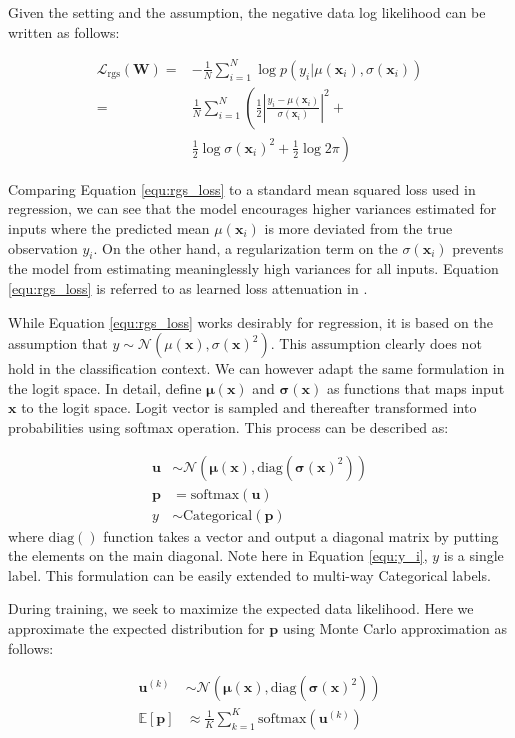 \documentclass[letterpaper]{article} %
\newcommand{\vect}[1]{\mathbf{#1}}
\newcommand{\matr}[1]{\mathbf{#1}}
\newcommand{\vp}[0]{\vect{p}}
\newcommand{\vu}[0]{\vect{u}}
\newcommand{\vx}[0]{\vect{x}}
\newcommand{\vmu}{\boldsymbol{\mu}}
\newcommand{\vsigma}{\boldsymbol{\sigma}}
\newcommand{\vlb}{\mathcal{L}}
\newcommand{\E}{\mathbb{E}}
\newcommand{\N}{\mathcal{N}}
\newcommand{\mW}[0]{\matr{W}}
\newcommand\diag{\text{diag}}
\newcommand\softmax{\text{softmax}}
\begin{document}
Given the setting and the assumption, the negative data log likelihood can be written as follows:

\begin{align}
\label{equ:rgs_loss}
\vlb_{\text{rgs}}(\mW)= & -\frac{1}{N}\sum_{i=1}^N\log{p(y_i|\mu(\vx_i),\sigma(\vx_i))} \nonumber \\
= & \frac{1}{N} \sum_{i=1}^N \left(\frac{1}{2}\left|\frac{y_i-\mu(\vx_i)}{\sigma(\vx_i)}\right|^2 + \right.\nonumber \\
& \left.\frac{1}{2}\log{\sigma(\vx_i)^2} + \frac{1}{2}\log{2\pi}\right)
\end{align}

Comparing Equation \ref{equ:rgs_loss} to a standard mean squared loss used in regression, we can see that the model encourages higher variances estimated for inputs where the predicted mean $\mu(\vx_i)$ is more deviated from the true observation $y_i$. On the other hand, a regularization term on the $\sigma(\vx_i)$ prevents the model from estimating meaninglessly high variances for all inputs. Equation \ref{equ:rgs_loss} is referred to as learned loss attenuation in \cite{kendall2017uncertainties}.

While Equation \ref{equ:rgs_loss} works desirably for regression, it is based on the assumption that $y\sim\N(\mu(\vx), \sigma(\vx)^2)$. This assumption clearly does not hold in the classification context. We can however adapt the same formulation in the logit space. In detail, define $\vmu(\vx)$ and $\vsigma(\vx)$ as functions that maps input $\vx$ to the logit space. Logit vector is sampled and thereafter transformed into probabilities using softmax operation. This process can be described as:

\begin{align}
\vu &\sim \N\left(\vmu(\vx), \diag(\vsigma(\vx)^2)\right) \\
\vp &= \softmax(\vu) \\
y &\sim \text{Categorical}(\vp) \label{equ:y_i}
\end{align}
where $\diag()$ function takes a vector and output a diagonal matrix by putting the elements on the main diagonal.
Note here in Equation \ref{equ:y_i}, $y$ is a single label. This formulation can be easily extended to multi-way Categorical labels.

During training, we seek to maximize the expected data likelihood. Here we approximate the expected distribution for $\vp$ using Monte Carlo approximation as follows:

\begin{align}
\vu^{(k)}& \sim \N\left(\vmu(\vx), \diag(\vsigma(\vx)^2)\right) \\
\E[\vp]& \approx\frac{1}{K}\sum_{k=1}^K\softmax(\vu^{(k)})
\end{align}
\end{document}
